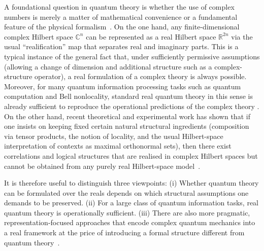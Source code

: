 \documentclass[%
  reprint,
  superscriptaddress,
  amsmath,amssymb,
  pra,
  floatfix,
  longbibliography
]{revtex4-2}
\begin{document}
A foundational question in quantum theory is whether the use of complex
numbers is merely a matter of mathematical convenience or a fundamental
feature of the physical formalism~\cite{renou-2021,Weilenmann2025PartialIndependencePRL,Hoffreumon2025NoComplex,Hita2025RealQM,Ying2025FoilComplex,Hardy2012LimitedHolism,Stueckelberg1961RealHilbertII,Bednorz2022OptimalDiscrimination,Aleksandrova2013UniversalQubit,Wootters2016OptimalInformationTransfer,Rudolph2002TwoRebitUniversal,McKague2009SimulatingRealHilbert,Erba2024CompositionRule}.
On the one hand, any finite-dimensional complex Hilbert space $\mathbb{C}^n$ can be
represented as a real Hilbert space $\mathbb{R}^{2n}$ via the usual
``realification'' map that separates real and imaginary parts. This is a
typical instance of the general fact that, under sufficiently permissive
assumptions (allowing a change of dimension and additional structure such as
a complex-structure operator), a real formulation of a complex theory is
always possible. Moreover, for many quantum information processing tasks
such as quantum computation and Bell nonlocality, standard real quantum
theory in this sense is already sufficient to reproduce the operational
predictions of the complex theory
\cite{Aleksandrova2013UniversalQubit,Wootters2016OptimalInformationTransfer,Rudolph2002TwoRebitUniversal,McKague2009SimulatingRealHilbert}.
On the other hand, recent theoretical and experimental work has shown that
if one insists on keeping fixed certain natural structural ingredients
(composition via tensor products, the notion of locality, and the usual
Hilbert-space interpretation of contexts as maximal orthonormal sets), then
there exist correlations and logical structures that are realised in complex
Hilbert spaces but cannot be obtained from any purely real Hilbert-space
model~\cite{renou-2021,Weilenmann2025PartialIndependencePRL,Hoffreumon2025NoComplex,Hita2025RealQM,Ying2025FoilComplex,Bednorz2022OptimalDiscrimination,Erba2024CompositionRule}.

It is therefore useful to distinguish three viewpoints:
(i) Whether quantum theory can be formulated over the reals depends on which
structural assumptions one demands to be preserved.
(ii) For a large class of quantum information tasks, real quantum theory is
operationally sufficient.
(iii) There are also more pragmatic, representation-focused approaches that
encode complex quantum mechanics into a real framework at the price of
introducing a formal structure different from quantum theory~\cite{BarriosHita2025RealQM}.
\end{document}
